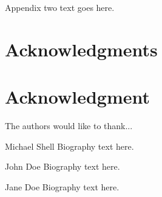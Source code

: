 \documentclass[12pt,journal,compsoc]{IEEEtran}
\begin{document}
\section{}
Appendix two text goes here.
\ifCLASSOPTIONcompsoc
  \section*{Acknowledgments}
\else
  \section*{Acknowledgment}
\fi
The authors would like to thank...
\ifCLASSOPTIONcaptionsoff
  \newpage
\fi
{}
\begin{IEEEbiography}{Michael Shell}
Biography text here.
\end{IEEEbiography}
\begin{IEEEbiographynophoto}{John Doe}
Biography text here.
\end{IEEEbiographynophoto}
\begin{IEEEbiographynophoto}{Jane Doe}
Biography text here.
\end{IEEEbiographynophoto}
\end{document}

